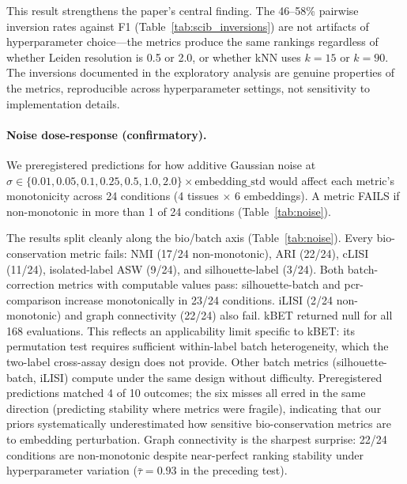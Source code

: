 \documentclass[9pt,lineno]{elife}
\begin{document}
This result strengthens the paper's central finding. The 46--58\% pairwise inversion rates against F1 (Table~\ref{tab:scib_inversions}) are not artifacts of hyperparameter choice---the metrics produce the same rankings regardless of whether Leiden resolution is 0.5 or 2.0, or whether kNN uses $k = 15$ or $k = 90$. The inversions documented in the exploratory analysis are genuine properties of the metrics, reproducible across hyperparameter settings, not sensitivity to implementation details.

\paragraph{Noise dose-response (confirmatory).} We preregistered predictions for how additive Gaussian noise at $\sigma \in \{0.01, 0.05, 0.1, 0.25, 0.5, 1.0, 2.0\} \times \text{embedding\_std}$ would affect each metric's monotonicity across 24 conditions (4 tissues $\times$ 6 embeddings). A metric FAILS if non-monotonic in more than 1 of 24 conditions (Table~\ref{tab:noise}).

The results split cleanly along the bio/batch axis (Table~\ref{tab:noise}). Every bio-conservation metric fails: NMI (17/24 non-monotonic), ARI (22/24), cLISI (11/24), isolated-label ASW (9/24), and silhouette-label (3/24). Both batch-correction metrics with computable values pass: silhouette-batch and pcr-comparison increase monotonically in 23/24 conditions. iLISI (2/24 non-monotonic) and graph connectivity (22/24) also fail. kBET returned null for all 168 evaluations. This reflects an applicability limit specific to kBET: its permutation test requires sufficient within-label batch heterogeneity, which the two-label cross-assay design does not provide. Other batch metrics (silhouette-batch, iLISI) compute under the same design without difficulty. Preregistered predictions matched 4 of 10 outcomes; the six misses all erred in the same direction (predicting stability where metrics were fragile), indicating that our priors systematically underestimated how sensitive bio-conservation metrics are to embedding perturbation. Graph connectivity is the sharpest surprise: 22/24 conditions are non-monotonic despite near-perfect ranking stability under hyperparameter variation ($\bar{\tau} = 0.93$ in the preceding test).
\end{document}
